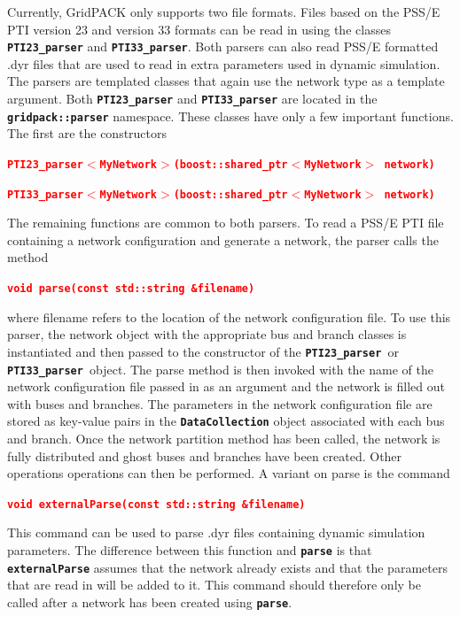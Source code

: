 \documentclass[12pt]{report} %
\begin{document}
Currently, GridPACK only supports two file formats. Files based on the PSS/E PTI version 23 and version 33 formats can be read in using the classes \texttt{\textbf{PTI23\_parser}} and \texttt{\textbf{PTI33\_parser}}. Both parsers can also read PSS/E formatted .dyr files that are used to read in extra parameters used in dynamic simulation. The parsers are templated classes that again use the network type as a template argument. Both \texttt{\textbf{PTI23\_parser}} and \texttt{\textbf{PTI33\_parser}} are located in the \texttt{\textbf{gridpack::parser}} namespace. These classes have only a few important functions. The first are the constructors

\textcolor{red}{\texttt{\textbf{PTI23\_parser$\boldsymbol{\mathrm{<}}$MyNetwork$\boldsymbol{\mathrm{>}}$(boost::shared\_ptr$\boldsymbol{\mathrm{<}}$MyNetwork$\boldsymbol{\mathrm{>}}$ network)}}}

\textcolor{red}{\texttt{\textbf{PTI33\_parser$\boldsymbol{\mathrm{<}}$MyNetwork$\boldsymbol{\mathrm{>}}$(boost::shared\_ptr$\boldsymbol{\mathrm{<}}$MyNetwork$\boldsymbol{\mathrm{>}}$ network)}}}

The remaining functions are common to both parsers. To read a PSS/E PTI file containing a network configuration and generate a network, the parser calls the method

\textcolor{red}{\texttt{\textbf{void parse(const std::string \&filename)}}}

where filename refers to the location of the network configuration file. To use this parser, the network object with the appropriate bus and branch classes is instantiated and then passed to the constructor of the \texttt{\textbf{PTI23\_parser }}or\texttt{\textbf{ PTI33\_parser }}object. The parse method is then invoked with the name of the network configuration file passed in as an argument and the network is filled out with buses and branches. The parameters in the network configuration file are stored as key-value pairs in the \texttt{\textbf{DataCollection}} object associated with each bus and branch. Once the network partition method has been called, the network is fully distributed and ghost buses and branches have been created. Other operations operations can then be performed. A variant on parse is the command

\textcolor{red}{\texttt{\textbf{void externalParse(const std::string \&filename)}}}

This command can be used to parse .dyr files containing dynamic simulation parameters. The difference between this function and \texttt{\textbf{parse}} is that \texttt{\textbf{externalParse}} assumes that the network already exists and that the parameters that are read in will be added to it. This command should therefore only be called after a network has been created using \texttt{\textbf{parse}}.
\end{document}
